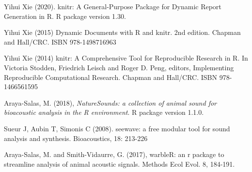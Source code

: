\documentclass[
]{article}
\begin{document}
Yihui Xie (2020). knitr: A General-Purpose Package for Dynamic Report
Generation in R. R package version 1.30.

Yihui Xie (2015) Dynamic Documents with R and knitr. 2nd edition.
Chapman and Hall/CRC. ISBN 978-1498716963

Yihui Xie (2014) knitr: A Comprehensive Tool for Reproducible Research
in R. In Victoria Stodden, Friedrich Leisch and Roger D. Peng, editors,
Implementing Reproducible Computational Research. Chapman and Hall/CRC.
ISBN 978-1466561595

Araya-Salas, M. (2018), \emph{NatureSounds: a collection of animal sound
for bioacoustic analysis in the R environment}. R package version 1.1.0.

Sueur J, Aubin T, Simonis C (2008). seewave: a free modular tool for
sound analysis and synthesis. Bioacoustics, 18: 213-226

Araya-Salas, M. and Smith-Vidaurre, G. (2017), warbleR: an r package to
streamline analysis of animal acoustic signals. Methods Ecol Evol. 8,
184-191.
\end{document}

